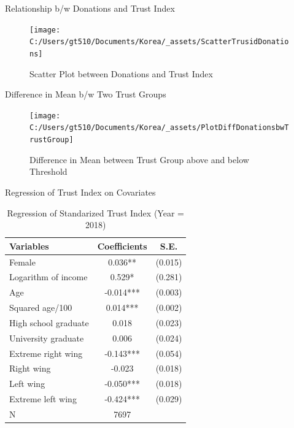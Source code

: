 \documentclass[
  ignorenonframetext,
]{beamer}
\begin{document}
\begin{frame}{Relationship b/w Donations and Trust Index}
\protect\hypertarget{relationship-bw-donations-and-trust-index}{}

\begin{figure}
\texttt{[image: C:/Users/gt510/Documents/Korea/\_assets/ScatterTrusidDonations]} \caption{Scatter Plot between Donations and Trust Index}\label{fig:unnamed-chunk-4}
\end{figure}

\end{frame}

\begin{frame}{Difference in Mean b/w Two Trust Groups}
\protect\hypertarget{difference-in-mean-bw-two-trust-groups}{}

\begin{figure}
\texttt{[image: C:/Users/gt510/Documents/Korea/\_assets/PlotDiffDonationsbwTrustGroup]} \caption{Difference in Mean between Trust Group above and below Threshold}\label{fig:unnamed-chunk-5}
\end{figure}

\end{frame}

\begin{frame}{Regression of Trust Index on Covariates}
\protect\hypertarget{regression-of-trust-index-on-covariates}{}

\begin{table}

\caption{\label{tab:kableRegTrustidOnCovariate}Regression of Standarized Trust Index (Year = 2018)}
\centering
\begin{tabular}[t]{lcc}
\toprule
Variables & Coefficients & S.E.\\
\midrule
Female & 0.036** & (0.015)\\
Logarithm of income & 0.529* & (0.281)\\
Age & -0.014*** & (0.003)\\
Squared age/100 & 0.014*** & (0.002)\\
High school graduate & 0.018 & (0.023)\\
University graduate & 0.006 & (0.024)\\
Extreme right wing & -0.143*** & (0.054)\\
Right wing & -0.023 & (0.018)\\
Left wing & -0.050*** & (0.018)\\
Extreme left wing & -0.424*** & (0.029)\\
N & 7697 & \\
\bottomrule
\end{tabular}
\end{table}

\end{frame}
\end{document}
